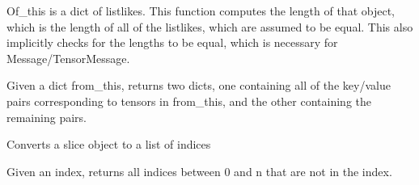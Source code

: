 \documentclass[letterpaper,10pt,english]{sphinxmanual}
\begin{document}
\begin{fulllineitems}
\label{\detokenize{Fireworks:Fireworks.core.message.compute_length}}
Of\_this is a dict of listlikes. This function computes the length of that object, which is the length of all of the listlikes, which
are assumed to be equal. This also implicitly checks for the lengths to be equal, which is necessary for Message/TensorMessage.

\end{fulllineitems}


\begin{fulllineitems}
\label{\detokenize{Fireworks:Fireworks.core.message.extract_tensors}}
Given a dict from\_this, returns two dicts, one containing all of the key/value pairs corresponding to tensors in from\_this, and the other
containing the remaining pairs.

\end{fulllineitems}


\begin{fulllineitems}
\label{\detokenize{Fireworks:Fireworks.core.message.slice_to_list}}
Converts a slice object to a list of indices

\end{fulllineitems}


\begin{fulllineitems}
\label{\detokenize{Fireworks:Fireworks.core.message.complement}}
Given an index, returns all indices between 0 and n that are not in the index.

\end{fulllineitems}

\end{document}
